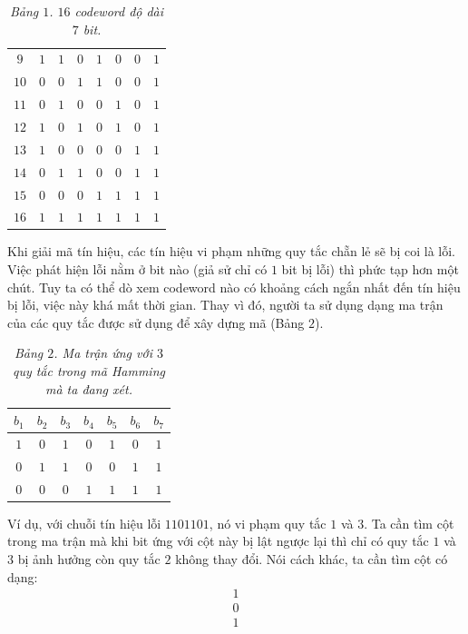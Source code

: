 \begin{multicols}{2}
\begin{table}[H]
\begin{tabular}{c c c c c c c c}
			$9$ &$1$&$1$&$0$&$1$&$0$&$0$&$1$\\
			$10$ &$0$&$0$&$1$&$1$&$0$&$0$&$1$\\
			$11$ &$0$&$1$&$0$&$0$&$1$&$0$&$1$\\
			$12$ &$1$&$0$&$1$&$0$&$1$&$0$&$1$\\
			$13$ &$1$&$0$&$0$&$0$&$0$&$1$&$1$\\
			$14$ &$0$&$1$&$1$&$0$&$0$&$1$&$1$\\
			$15$ &$0$&$0$&$0$&$1$&$1$&$1$&$1$\\
			$16$ &$1$&$1$&$1$&$1$&$1$&$1$&$1$\\
			\hline
		\end{tabular}	
		\caption{\small\textit{\color{toanhocdoisong}Bảng $1$. $16$ codeword độ dài $7$ bit.}}
		\vspace*{-10pt}
	\end{table}
	Khi giải mã tín hiệu, các tín hiệu vi phạm những quy tắc chẵn lẻ sẽ bị coi là lỗi. Việc phát hiện lỗi nằm ở bit nào (giả sử chỉ có $1$ bit bị lỗi) thì phức tạp hơn một chút. Tuy ta có thể dò xem codeword nào có khoảng cách ngắn nhất đến tín hiệu bị lỗi, việc này khá mất thời gian. Thay vì đó, người ta sử dụng dạng ma trận của các quy tắc được sử dụng để xây dựng mã (Bảng $2$).
	\begin{table}[H]
		\vspace*{-5pt}
		\centering
		\captionsetup{labelformat= empty, justification=centering}
		\begin{tabular}{ccccccc}
			\hline
			$b_1$ & $b_2$& $b_3$& $b_4$&$b_5$ &$b_6$ &$b_7$\\
			\hline
			$1$ & $0$&$1$&$0$&$1$&$0$&$1$\\
			$0$ & $1$&$1$&$0$&$0$&$1$&$1$\\
			$0$ & $0$&$0$&$1$&$1$&$1$&$1$\\
		\end{tabular}	
		\caption{\small\textit{\color{toanhocdoisong}Bảng $2$. Ma trận ứng với $3$ quy tắc trong mã Hamming mà ta đang xét.}}
		\vspace*{-5pt}
	\end{table}
	Ví dụ, với chuỗi tín hiệu lỗi $1101101$, nó vi phạm quy tắc $1$ và $3$. Ta cần tìm cột trong ma trận mà khi bit ứng với cột này bị lật ngược lại thì chỉ có quy tắc $1$ và $3$ bị ảnh hưởng còn quy tắc $2$ không thay đổi. Nói cách khác, ta cần tìm cột có dạng:
	\begin{align*}
		1\\[-0.5ex]
		0\\[-0.5ex]
		1
	\end{align*}

\end{multicols}
